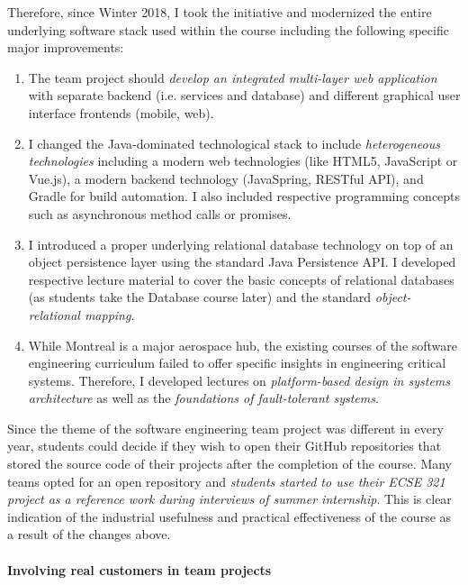 \documentclass[a4paper,11pt]{report}
\begin{document}
Therefore, since Winter 2018, I took the initiative and modernized the entire underlying software stack used within the course including the following specific major improvements:
\begin{enumerate}
\item The team project should \emph{develop an integrated multi-layer web application} with separate backend (i.e. services and database) and different graphical user interface frontends (mobile, web). 
\item I changed the Java-dominated technological stack to include \emph{heterogeneous technologies} including a modern web technologies (like HTML5, JavaScript or Vue.js), a modern backend technology (JavaSpring, RESTful API), and Gradle for build automation. I also included respective programming concepts such as asynchronous method calls or promises. 
\item I introduced a proper underlying relational database technology on top of an object persistence layer using the standard Java Persistence API. I developed respective lecture material to cover the basic concepts of relational databases (as students take the Database course later) and the standard \emph{object-relational mapping}.  
\item While Montreal is a major aerospace hub, the existing courses of the software engineering curriculum failed to offer specific insights in engineering critical systems. Therefore, I developed lectures on \emph{platform-based design in systems architecture} as well as the \emph{foundations of fault-tolerant systems}.
\end{enumerate}

Since the theme of the software engineering team project was different in every year, students could decide if they wish to open their GitHub repositories that stored the source code of their projects after the completion of the course. Many teams opted for an open repository and \emph{students started to use their ECSE 321 project as a reference work during interviews of summer internship}. This is clear indication of the industrial usefulness and practical effectiveness of the course as a result of the changes above. 

\paragraph{Involving real customers in team projects}
\end{document}
